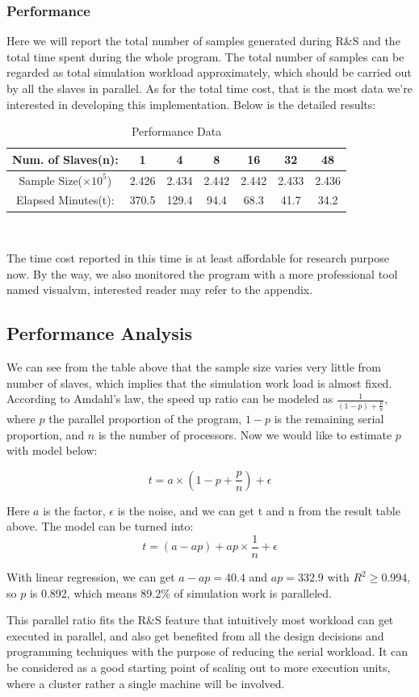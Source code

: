\subsubsection{Performance}

Here we will report the total number of samples generated during R\&S and the total time spent during the whole program. The total number of samples can be regarded as total simulation workload approximately, which should be carried out by all the slaves in parallel. As for the total time cost, that is the most data we're interested in developing this implementation. Below is the detailed results:

\begin{table}[ht]
\begin{center}
\begin{tabular}{|c|c|c|c|c|c|c|}
\hline
Num. of Slaves(n): & 1 & 4 & 8 & 16 & 32 & 48 \\
\hline
Sample Size($\times 10^5$) & 2.426 & 2.434 & 2.442 & 2.442 & 2.433 & 2.436\\
\hline
Elapsed Minutes(t): & 370.5 & 129.4 & 94.4 & 68.3 & 41.7 & 34.2 \\
\hline
\end{tabular} \\
\caption{Performance Data}
\end{center}
\end{table}

The time cost reported in this time is at least affordable for research purpose now. By the way, we also monitored the program with a more professional tool named visualvm, interested reader may refer to the appendix.

\subsection{Performance Analysis}

We can see from the table above that the sample size varies very little from number of slaves, which implies that the simulation work load is almost fixed. According to Amdahl's law, the speed up ratio can be modeled as $\frac{1}{(1 - p) + \frac{p}{n}}$, where $p$ the parallel proportion of the program, $1 - p$ is the remaining serial proportion, and $n$ is the number of processors. Now we would like to estimate $p$ with model below:

$$ t = a \times (1 - p + \frac{p}{n}) + \epsilon $$

Here $a$ is the factor, $\epsilon$ is the noise, and we can get t and n from the result table above. The model can be turned into: 
$$ t = (a - ap) + ap \times \frac{1}{n} + \epsilon $$

With linear regression, we can get $a - ap = 40.4$ and $ap = 332.9$ with $R^2 \geqslant 0.994$, so $p$ is 0.892, which means 89.2\% of simulation work is paralleled.

This parallel ratio fits the R\&S feature that intuitively most workload can get executed in parallel, and also get benefited from all the design decisions and programming techniques with the purpose of reducing the serial workload. It can be considered as a good starting point of scaling out to more execution units, where a cluster rather a single machine will be involved.
